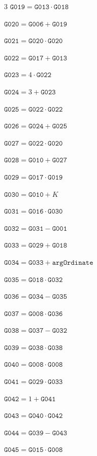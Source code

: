 \documentclass[10pt]{article}
\begin{document}
\begin{multicols}{3}
\noindent $\mathtt{G019}=\mathtt{G013}\cdot \mathtt{G018}$\par
\noindent $\mathtt{G020}=\mathtt{G006}+\mathtt{G019}$\par
\noindent $\mathtt{G021}=\mathtt{G020}\cdot \mathtt{G020}$\par
\noindent $\mathtt{G022}=\mathtt{G017}+\mathtt{G013}$\par
\noindent $\mathtt{G023}=4\cdot \mathtt{G022}$\par
\noindent $\mathtt{G024}=3+\mathtt{G023}$\par
\noindent $\mathtt{G025}=\mathtt{G022}\cdot \mathtt{G022}$\par
\noindent $\mathtt{G026}=\mathtt{G024}+\mathtt{G025}$\par
\noindent $\mathtt{G027}=\mathtt{G022}\cdot \mathtt{G020}$\par
\noindent $\mathtt{G028}=\mathtt{G010}+\mathtt{G027}$\par
\noindent $\mathtt{G029}=\mathtt{G017}\cdot \mathtt{G019}$\par
\noindent $\mathtt{G030}=\mathtt{G010}+K$\par
\noindent $\mathtt{G031}=\mathtt{G016}\cdot \mathtt{G030}$\par
\noindent $\mathtt{G032}=\mathtt{G031}-\mathtt{G001}$\par
\noindent $\mathtt{G033}=\mathtt{G029}+\mathtt{G018}$\par
\noindent $\mathtt{G034}=\mathtt{G033}+\mathtt{argOrdinate}$\par
\noindent $\mathtt{G035}=\mathtt{G018}\cdot \mathtt{G032}$\par
\noindent $\mathtt{G036}=\mathtt{G034}-\mathtt{G035}$\par
\noindent $\mathtt{G037}=\mathtt{G008}\cdot \mathtt{G036}$\par
\noindent $\mathtt{G038}=\mathtt{G037}-\mathtt{G032}$\par
\noindent $\mathtt{G039}=\mathtt{G038}\cdot \mathtt{G038}$\par
\noindent $\mathtt{G040}=\mathtt{G008}\cdot \mathtt{G008}$\par
\noindent $\mathtt{G041}=\mathtt{G029}\cdot \mathtt{G033}$\par
\noindent $\mathtt{G042}=1+\mathtt{G041}$\par
\noindent $\mathtt{G043}=\mathtt{G040}\cdot \mathtt{G042}$\par
\noindent $\mathtt{G044}=\mathtt{G039}-\mathtt{G043}$\par
\noindent $\mathtt{G045}=\mathtt{G015}\cdot \mathtt{G008}$\par

\end{multicols}
\end{document}
